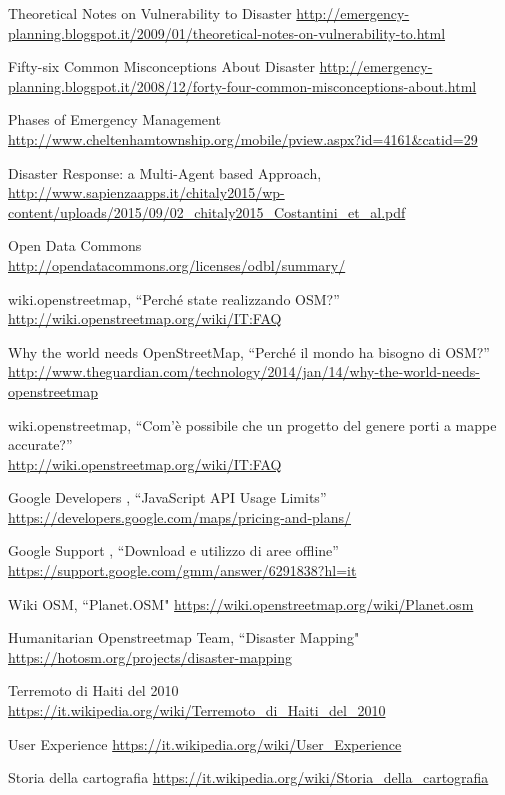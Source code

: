 \begin{thebibliography}{99}

Theoretical Notes on Vulnerability to Disaster
\url{http://emergency-planning.blogspot.it/2009/01/theoretical-notes-on-vulnerability-to.html}

Fifty-six Common Misconceptions About Disaster
\url{http://emergency-planning.blogspot.it/2008/12/forty-four-common-misconceptions-about.html}

Phases of Emergency Management
\url{http://www.cheltenhamtownship.org/mobile/pview.aspx?id=4161&catid=29}

Disaster Response: a Multi-Agent based Approach,
\url{http://www.sapienzaapps.it/chitaly2015/wp-content/uploads/2015/09/02_chitaly2015_Costantini_et_al.pdf}


Open Data Commons  \\
\url{http://opendatacommons.org/licenses/odbl/summary/}

wiki.openstreetmap, ``Perché state realizzando OSM?'' \\
\url{http://wiki.openstreetmap.org/wiki/IT:FAQ}

Why the world needs OpenStreetMap, ``Perché il mondo ha bisogno di OSM?''
\url{http://www.theguardian.com/technology/2014/jan/14/why-the-world-needs-openstreetmap}

wiki.openstreetmap, ``Com'è possibile che un progetto del genere porti a mappe accurate?'' \\
\url{http://wiki.openstreetmap.org/wiki/IT:FAQ}

Google Developers ,  ``JavaScript API Usage Limits''
\url{https://developers.google.com/maps/pricing-and-plans/}


Google Support ,  ``Download e utilizzo di aree offline''
\url{https://support.google.com/gmm/answer/6291838?hl=it}

Wiki OSM,  ``Planet.OSM"
\url{https://wiki.openstreetmap.org/wiki/Planet.osm}

Humanitarian Openstreetmap Team,  ``Disaster Mapping"
\url{https://hotosm.org/projects/disaster-mapping}

Terremoto di Haiti del 2010
\url{https://it.wikipedia.org/wiki/Terremoto_di_Haiti_del_2010}

User Experience
\url{https://it.wikipedia.org/wiki/User_Experience}

Storia della cartografia
\url{https://it.wikipedia.org/wiki/Storia_della_cartografia}
 




\end{thebibliography}



